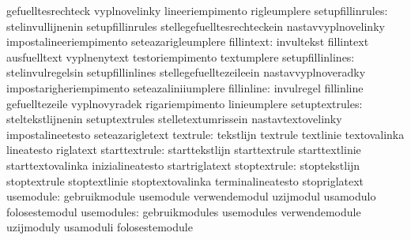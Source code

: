                                   gefuelltesrechteck               vyplnovelinky %
                                  lineeriempimento                 rigleumplere
                setupfillinrules: stelinvullijnenin                setupfillinrules
                                  stellegefuelltesrechteckein      nastavvyplnovelinky
                                  impostalineeriempimento          seteazarigleumplere
                      fillintext: invultekst                       fillintext
                                  ausfuelltext                     vyplnenytext
                                  testoriempimento                 textumplere
                setupfillinlines: stelinvulregelsin                setupfillinlines
                                  stellegefuelltezeileein          nastavvyplnoveradky
                                  impostarigheriempimento          seteazaliniiumplere
                      fillinline: invulregel                       fillinline
                                  gefuelltezeile                   vyplnovyradek
                                  rigariempimento                  linieumplere
                  setuptextrules: steltekstlijnenin                setuptextrules
                                  stelletextumrissein              nastavtextovelinky
                                  impostalineetesto                seteazarigletext
                        textrule: tekstlijn                        textrule
                                  textlinie                        textovalinka
                                  lineatesto                       riglatext
                   starttextrule: starttekstlijn                   starttextrule
                                  starttextlinie                   starttextovalinka
                                  inizialineatesto                 startriglatext
                    stoptextrule: stoptekstlijn                    stoptextrule
                                  stoptextlinie                    stoptextovalinka
                                  terminalineatesto                stopriglatext
                       usemodule: gebruikmodule                    usemodule
                                  verwendemodul                    uzijmodul
                                  usamodulo                        folosestemodul
                      usemodules: gebruikmodules                   usemodules
                                  verwendemodule                   uzijmoduly
                                  usamoduli                        folosestemodule
